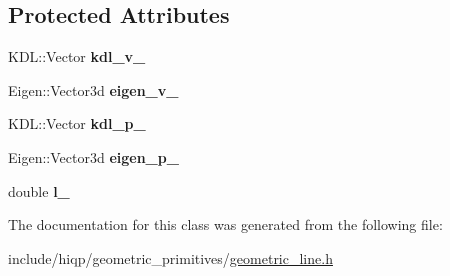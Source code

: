 \subsection*{Protected Attributes}
\begin{DoxyCompactItemize}
\item 
\hypertarget{classhiqp_1_1GeometricLine_a23c0355138c8aac40c6c70f71b0bfff1}{K\-D\-L\-::\-Vector {\bfseries kdl\-\_\-v\-\_\-}}\label{classhiqp_1_1GeometricLine_a23c0355138c8aac40c6c70f71b0bfff1}

\item 
\hypertarget{classhiqp_1_1GeometricLine_abef16025c76034b589cb82afc246e97d}{Eigen\-::\-Vector3d {\bfseries eigen\-\_\-v\-\_\-}}\label{classhiqp_1_1GeometricLine_abef16025c76034b589cb82afc246e97d}

\item 
\hypertarget{classhiqp_1_1GeometricLine_a5e4cd34a65acf89949ff917eb33cb4f4}{K\-D\-L\-::\-Vector {\bfseries kdl\-\_\-p\-\_\-}}\label{classhiqp_1_1GeometricLine_a5e4cd34a65acf89949ff917eb33cb4f4}

\item 
\hypertarget{classhiqp_1_1GeometricLine_a5a16b76e817299bc2e74df9a11dc8125}{Eigen\-::\-Vector3d {\bfseries eigen\-\_\-p\-\_\-}}\label{classhiqp_1_1GeometricLine_a5a16b76e817299bc2e74df9a11dc8125}

\item 
\hypertarget{classhiqp_1_1GeometricLine_aebb286780a7a54f5e7b6840e7d53d4f2}{double {\bfseries l\-\_\-}}\label{classhiqp_1_1GeometricLine_aebb286780a7a54f5e7b6840e7d53d4f2}

\end{DoxyCompactItemize}


The documentation for this class was generated from the following file\-:\begin{DoxyCompactItemize}
\item 
include/hiqp/geometric\-\_\-primitives/\hyperlink{geometric__line_8h}{geometric\-\_\-line.\-h}\end{DoxyCompactItemize}
